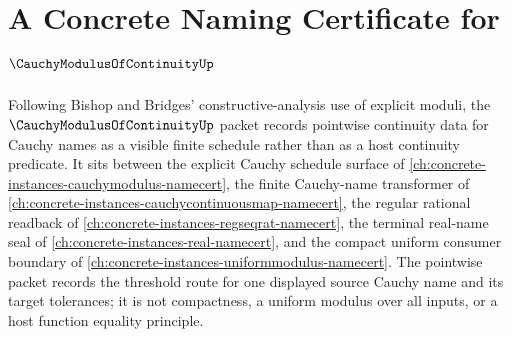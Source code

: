 \chapter{A Concrete Naming Certificate for $\CauchyModulusOfContinuityUp$}
\label{ch:concrete-instances-cauchymodulusofcontinuity-namecert}

Following Bishop and Bridges' constructive-analysis use of explicit moduli,
the $\CauchyModulusOfContinuityUp$ packet records pointwise continuity data for
Cauchy names as a visible finite schedule rather than as a host continuity
predicate. It sits between the explicit Cauchy schedule surface of
\autoref{ch:concrete-instances-cauchymodulus-namecert}, the finite
Cauchy-name transformer of
\autoref{ch:concrete-instances-cauchycontinuousmap-namecert}, the regular
rational readback of \autoref{ch:concrete-instances-regseqrat-namecert}, the
terminal real-name seal of \autoref{ch:concrete-instances-real-namecert}, and
the compact uniform consumer boundary of
\autoref{ch:concrete-instances-uniformmodulus-namecert}. The pointwise packet
records the threshold route for one displayed source Cauchy name and its
target tolerances; it is not compactness, a uniform modulus over all inputs,
or a host function equality principle.

